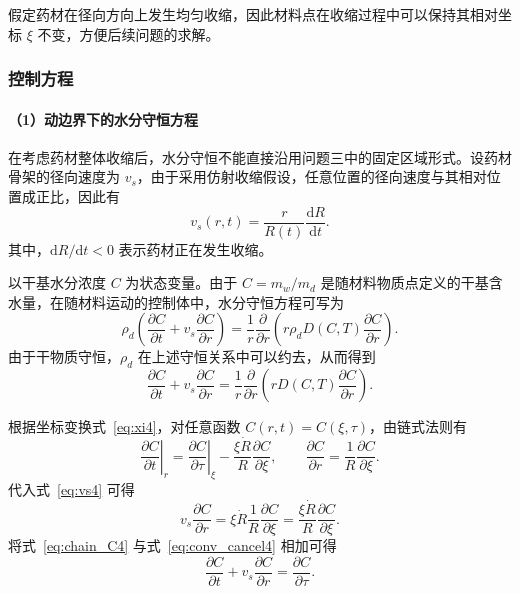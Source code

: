 \documentclass[12pt,a4paper]{article}
\begin{document}
假定药材在径向方向上发生均匀收缩，因此材料点在收缩过程中可以保持其相对坐标 \(\xi\) 不变，方便后续问题的求解\cite{adrover2019}。

\subsubsection{控制方程}

\paragraph{（1）动边界下的水分守恒方程}

在考虑药材整体收缩后，水分守恒不能直接沿用问题三中的固定区域形式。设药材骨架的径向速度为 \(v_s\)，由于采用仿射收缩假设，任意位置的径向速度与其相对位置成正比\cite{adrover2019}，因此有
\begin{equation}
v_s(r,t)
=
\frac{r}{R(t)}\frac{\mathrm{d}R}{\mathrm{d}t}.
\label{eq:vs4}
\end{equation}
其中，\(\mathrm{d}R/\mathrm{d}t<0\) 表示药材正在发生收缩。

以干基水分浓度 \(C\) 为状态变量。由于 \(C=m_w/m_d\) 是随材料物质点定义的干基含水量，在随材料运动的控制体中，水分守恒方程可写为
\begin{equation}
\rho_d
\left(
\frac{\partial C}{\partial t}
+
v_s\frac{\partial C}{\partial r}
\right)
=
\frac{1}{r}
\frac{\partial}{\partial r}
\left(
r\rho_dD(C,T)
\frac{\partial C}{\partial r}
\right).
\label{eq:moisture_dynamic4}
\end{equation}
由于干物质守恒，\(\rho_d\) 在上述守恒关系中可以约去，从而得到
\begin{equation}
\frac{\partial C}{\partial t}
+
v_s\frac{\partial C}{\partial r}
=
\frac{1}{r}
\frac{\partial}{\partial r}
\left(
rD(C,T)
\frac{\partial C}{\partial r}
\right).
\label{eq:moisture_dynamic4_2}
\end{equation}

根据坐标变换式~\eqref{eq:xi4}，对任意函数 \(C(r,t)=C(\xi,\tau)\)，由链式法则有
\begin{equation}
\left.
\frac{\partial C}{\partial t}
\right|_r
=
\left.
\frac{\partial C}{\partial \tau}
\right|_\xi
-
\frac{\xi\dot R}{R}
\frac{\partial C}{\partial\xi},
\qquad
\frac{\partial C}{\partial r}
=
\frac{1}{R}
\frac{\partial C}{\partial\xi}.
\label{eq:chain_C4}
\end{equation}
代入式~\eqref{eq:vs4} 可得
\begin{equation}
v_s\frac{\partial C}{\partial r}
=
\xi\dot R
\frac{1}{R}
\frac{\partial C}{\partial\xi}
=
\frac{\xi\dot R}{R}
\frac{\partial C}{\partial\xi}.
\label{eq:conv_cancel4}
\end{equation}
将式~\eqref{eq:chain_C4} 与式~\eqref{eq:conv_cancel4} 相加可得
\begin{equation}
\frac{\partial C}{\partial t}
+
v_s\frac{\partial C}{\partial r}
=
\frac{\partial C}{\partial\tau}.
\label{eq:material_derivative4}
\end{equation}
\end{document}
